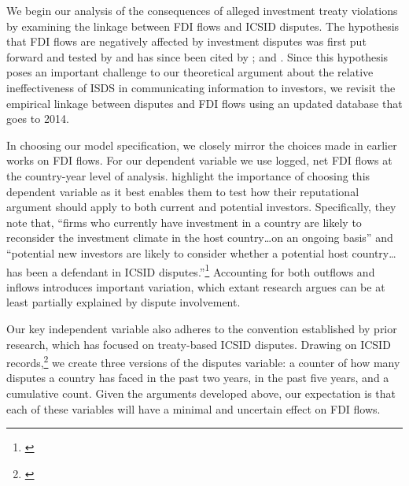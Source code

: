 \documentclass[12pt,onesided]{amsart}
\begin{document}
We begin our analysis of the consequences of alleged investment treaty violations by examining the linkage between FDI flows and ICSID disputes. The hypothesis that FDI flows are negatively affected by investment disputes was first put forward and tested by \citet{allee:peinhardt:2011} and has since been cited by \citet{berger2011more,poulsen2013claim,wellhausen2013,haftel2013delayed}; and \citet{kerner2014}. Since this hypothesis poses an important challenge to our theoretical argument about the relative ineffectiveness of ISDS in communicating information to investors, we revisit the empirical linkage between disputes and FDI flows using an updated database that goes to 2014.

In choosing our model specification, we closely mirror the choices made in earlier works on FDI flows. For our dependent variable we use logged, net FDI flows at the country-year level of analysis. \citeauthor{allee:peinhardt:2011} highlight the importance of choosing this dependent variable as it best enables them to test how their reputational argument should apply to both current and potential investors. Specifically, they note that, ``firms who currently have investment in a country are likely to reconsider the investment climate in the host country\ldots on an ongoing basis'' and ``potential new investors are likely to consider whether a potential host country\ldots has been a defendant in ICSID disputes.''\footnote{\citet[p. 419--420]{allee:peinhardt:2011}} Accounting for both outflows and inflows introduces important variation, which extant research argues can be at least partially explained by dispute involvement. 

\nocite{icsid:2014}
Our key independent variable also adheres to the convention established by prior research, which has focused on treaty-based ICSID disputes. Drawing on ICSID records,\footnote{\citet[p. 7, 10]{icsid:2015}} we create three versions of the disputes variable: a counter of how many disputes a country has faced in the past two years, in the past five years, and a cumulative count. Given the arguments developed above, our expectation is that each of these variables will have a minimal and uncertain effect on FDI flows.

\end{document}
